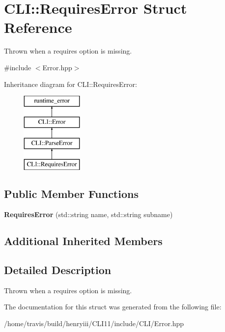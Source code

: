 \hypertarget{struct_c_l_i_1_1_requires_error}{}\section{C\+LI\+:\+:Requires\+Error Struct Reference}
\label{struct_c_l_i_1_1_requires_error}


Thrown when a requires option is missing.  




{\ttfamily \#include $<$Error.\+hpp$>$}

Inheritance diagram for C\+LI\+:\+:Requires\+Error\+:\begin{figure}[H]
\begin{center}
\leavevmode
\includegraphics[height=4.000000cm]{struct_c_l_i_1_1_requires_error}
\end{center}
\end{figure}
\subsection*{Public Member Functions}
\begin{DoxyCompactItemize}
\item 
\mbox{\label{struct_c_l_i_1_1_requires_error_afb74d006a67ea1e3ef2a3a400d64517b}} 
{\bfseries Requires\+Error} (std\+::string name, std\+::string subname)
\end{DoxyCompactItemize}
\subsection*{Additional Inherited Members}


\subsection{Detailed Description}
Thrown when a requires option is missing. 

The documentation for this struct was generated from the following file\+:\begin{DoxyCompactItemize}
\item 
/home/travis/build/henryiii/\+C\+L\+I11/include/\+C\+L\+I/Error.\+hpp\end{DoxyCompactItemize}
